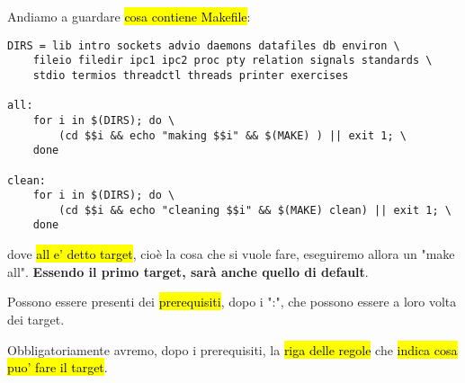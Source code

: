 Andiamo a guardare \hl{cosa contiene Makefile}:

\begin{lstlisting}
DIRS = lib intro sockets advio daemons datafiles db environ \
	fileio filedir ipc1 ipc2 proc pty relation signals standards \
	stdio termios threadctl threads printer exercises

all:
	for i in $(DIRS); do \
		(cd $$i && echo "making $$i" && $(MAKE) ) || exit 1; \
	done

clean:
	for i in $(DIRS); do \
		(cd $$i && echo "cleaning $$i" && $(MAKE) clean) || exit 1; \
	done
\end{lstlisting}

dove \hl{all e' detto target}, cioè la cosa che si vuole fare, eseguiremo allora un "make all". \textbf{Essendo il primo target, sarà anche quello di default}.

Possono essere presenti dei \hl{prerequisiti}, dopo i ":", che possono essere a loro volta dei target.

Obbligatoriamente avremo, dopo i prerequisiti, la \hl{riga delle regole} che \hl{indica cosa puo' fare il target}.